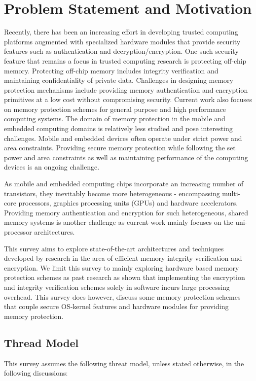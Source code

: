 \section{Problem Statement and Motivation}
\label{sec-introduction}

Recently, there has been an increasing effort in developing trusted computing
platforms augmented with specialized hardware modules that provide security
features such as authentication and decryption/encryption. One such security
feature that remains a focus in trusted computing research is protecting
off-chip memory. Protecting off-chip memory includes integrity verification and
maintaining confidentiality of private data. Challenges in designing memory
protection mechanisms include providing memory authentication and encryption
primitives at a low cost without compromising security. Current work also
focuses on memory protection schemes for general purpose and high performance
computing systems. The domain of memory protection in the mobile and embedded
computing domains is relatively less studied and pose interesting challenges.
Mobile and embedded devices often operate under strict power and area
constraints. Providing secure memory protection while following the set power
and area constraints as well as maintaining performance of the computing
devices is an ongoing challenge.

As mobile and embedded computing chips incorporate an increasing number of
transistors, they inevitably become more heterogeneous - encompassing
multi-core processors, graphics processing units (GPUs) and hardware
accelerators. Providing memory authentication and encryption for such
heterogeneous, shared memory systems is another challenge as current work
mainly focuses on the uni-processor architectures.

This survey aims to explore state-of-the-art architectures and techniques
developed by research in the area of efficient memory integrity verification
and encryption. We limit this survey to mainly exploring hardware based memory
protection schemes as past research as shown that implementing the encryption
and integrity verification schemes solely in software incurs large processing
overhead. This survey does however, discuss some memory protection schemes that
couple secure OS-kernel features and hardware modules for providing memory
protection.

\subsection{Thread Model}
This survey assumes the following threat model, unless stated otherwise, in the
following discussions:

